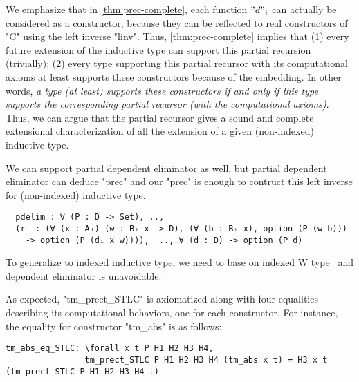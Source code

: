 We emphasize that in \cref{thm:prec-complete}, each function $"d"_i$ can
actually be considered as a constructor, because they can be reflected
to real constructors of "C" using the left inverse "linv". Thus, \cref{thm:prec-complete}
implies that (1) every future extension of the inductive type can
support this partial recursion (trivially); (2) every type supporting
this partial recursor with its computational axioms at least supports
these constructors because of the embedding. In other words, \textit{a
type (at least) supports these constructors if and only if this type
supports the corresponding partial recursor (with the computational
axioms)}.  Thus, we can argue that the partial recursor gives a sound and
complete extensional characterization of all the extension of a given (non-indexed)
inductive type.

We can support partial dependent eliminator as well, but partial dependent eliminator can deduce "prec" and our "prec" is enough to contruct this left inverse for (non-indexed) inductive type. 
\begin{verbatim}
  pdelim : ∀ (P : D -> Set), .., 
  (rᵢ : (∀ (x : Aᵢ) (w : Bᵢ x -> D), (∀ (b : Bᵢ x), option (P (w b))) 
    -> option (P (dᵢ x w)))),  .., ∀ (d : D) -> option (P d)
\end{verbatim}
To generalize to indexed inductive type, we need to base on indexed W type~\cite{martin1982constructive, morris2009indexed,jashug2017} and dependent eliminator is unavoidable. 

\noindent
As expected, "tm_prect_STLC" is axiomatized along with
four equalities describing its computational behaviors, one for each constructor.
For instance, the equality for constructor "tm_abs" is as follows:

\begin{centered}
\begin{minipage}{\textwidth}
\begin{lstlisting}[basicstyle=\fontsize{8.25}{9}\ttfamily]
tm_abs_eq_STLC: \forall x t P H1 H2 H3 H4,
                tm_prect_STLC P H1 H2 H3 H4 (tm_abs x t) = H3 x t (tm_prect_STLC P H1 H2 H3 H4 t)
\end{lstlisting}
\end{minipage}
\end{centered}

